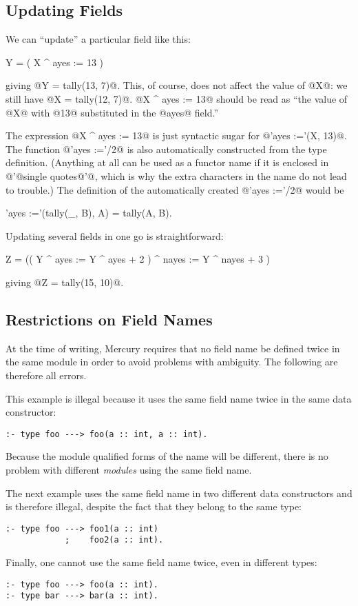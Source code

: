 \subsection{Updating Fields}

We can ``update'' a particular field like this:
\begin{myverbatim}
    Y = ( X ^ ayes := 13 )
\end{myverbatim}
giving @Y = tally(13, 7)@.  This, of course, does not affect the value
of @X@: we still have @X = tally(12, 7)@.  
@X ^ ayes := 13@ should be read as ``the value of @X@ with @13@
substituted in the @ayes@ field.''

The expression @X ^ ayes := 13@ is just syntactic sugar for
@'ayes :='(X, 13)@.  The function @'ayes :='/2@ is also automatically
constructed from the type definition.  (Anything at all can be used as a
functor name if it is enclosed in @'@single quotes@'@, which is why the
extra characters in the name do not lead to trouble.)  The definition of
the automatically created @'ayes :='/2@ would be
\begin{myverbatim}
'ayes :='(tally(_, B), A) = tally(A, B).
\end{myverbatim}

Updating several fields in one go is straightforward:
\begin{myverbatim}
    Z = (( Y ^ ayes  := Y ^ ayes  + 2 )
             ^ nayes := Y ^ nayes + 3 )
\end{myverbatim}
giving @Z = tally(15, 10)@.

\subsection{Restrictions on Field Names}

At the time of writing, Mercury requires that no field name be defined twice
in the same module in order to avoid problems with ambiguity.  The following
are therefore all errors.

This example is illegal because it uses the same field name twice in the
same data constructor:
\begin{verbatim}
:- type foo ---> foo(a :: int, a :: int).
\end{verbatim}
Because the module qualified forms of the name will be different, there is
no problem with different \emph{modules} using the same field name.

The next example uses the same field name in two different data
constructors and is therefore illegal, despite the fact that they belong to
the same type:
\begin{verbatim}
:- type foo ---> foo1(a :: int)
            ;    foo2(a :: int).
\end{verbatim}
Finally, one cannot use the same field name twice, even in different types:
\begin{verbatim}
:- type foo ---> foo(a :: int).
:- type bar ---> bar(a :: int).
\end{verbatim}

